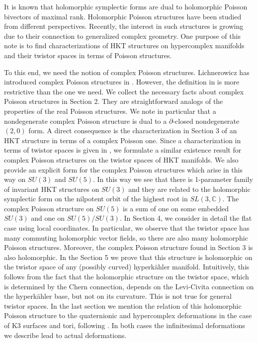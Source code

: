 \documentclass[11pt,oneside,leqno]{amsart}
\theoremstyle{plain}
\theoremstyle{definition}
\begin{document}
 It is known that holomorphic symplectic forms are dual to holomorphic Poisson bivectors of maximal rank. Holomorphic Poisson structures have been studied from different perspectives. Recently, the interest in such structures is growing due to their  connection to generalized complex geometry. One purpose of this note is to find characterizations of HKT structures on hypercomplex manifolds and their twistor spaces in terms of Poisson structures.

 To this end, we need the notion of complex Poisson structures. Lichnerowicz has introduced complex Poisson structures in \cite{L}. However, the definition in \cite{L} is more restrictive than the one we need. We collect the necessary facts about complex Poisson structures in Section 2. They are straightforward analogs of the properties of the  real Poisson structures. We note in particular that a nondegenerate complex Poisson structure is dual to a $\partial$-closed nondegenerate $(2,0)$ form. A direct consequence is the characterization in Section 3 of an HKT structure in terms of a complex Poisson one. Since a characterization in terms of twistor spaces is given in \cite{BS, GP}, we formulate a similar existence result for complex Poisson structures on the twistor spaces of HKT manifolds. We also provide an explicit form for the complex Poisson structures which arise in this way on $SU(3)$ and $SU(5)$. In this way we see that there is 1-parameter family of invariant HKT structures on $SU(3)$ and they are related to the holomorphic symplectic form on the nilpotent orbit of the highest root in $SL(3, \mathbb{C})$. The complex Poisson structure on $SU(5)$ is a sum of one on some embedded $SU(3)$ and one on $SU(5)/SU(3)$. In Section 4, we consider in detail the flat case using local coordinates. In particular, we observe that the twistor space has many commuting holomorphic vector fields, so there are also many holomorphic Poisson structures. Moreover, the complex Poisson structure found in Section 3 is also holomorphic. In the Section 5 we prove that this structure is holomorphic on the twistor space of any (possibly curved) hyperk\"ahler manifold. Intuitively, this follows from the fact that the holomorphic structure on the twistor space, which is determined by the Chern connection, depends on the Levi-Civita connection on the hyperk\"ahler base, but not on its curvature. This is not true for general twistor spaces. In the last section we mention the relation of this holomorphic Poisson structure to the quaternionic and hypercomplex deformations in the case of K3 surfaces and tori, following \cite{Hitchin}. In both cases the infinitesimal deformations we describe lead to actual deformations.
\vspace{.2in}
\end{document}
